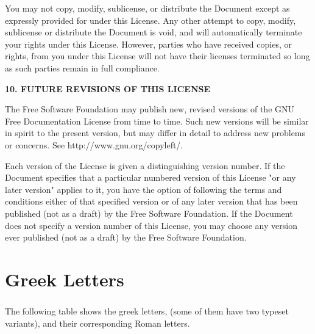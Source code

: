 You may not copy, modify, sublicense, or distribute the Document except
as expressly provided for under this License.  Any other attempt to
copy, modify, sublicense or distribute the Document is void, and will
automatically terminate your rights under this License.  However,
parties who have received copies, or rights, from you under this
License will not have their licenses terminated so long as such
parties remain in full compliance.


\begin{center}
{\Large\bf 10. FUTURE REVISIONS OF THIS LICENSE}
\end{center}


The Free Software Foundation may publish new, revised versions
of the GNU Free Documentation License from time to time.  Such new
versions will be similar in spirit to the present version, but may
differ in detail to address new problems or concerns.  See
http://www.gnu.org/copyleft/.

Each version of the License is given a distinguishing version number.
If the Document specifies that a particular numbered version of this
License "or any later version" applies to it, you have the option of
following the terms and conditions either of that specified version or
of any later version that has been published (not as a draft) by the
Free Software Foundation.  If the Document does not specify a version
number of this License, you may choose any version ever published (not
as a draft) by the Free Software Foundation.



















\chapter{Greek Letters}
\raggedbottom 

\paragraph{}
The following table shows the greek letters, (some of them have two 
typeset variants), and their corresponding Roman letters.


